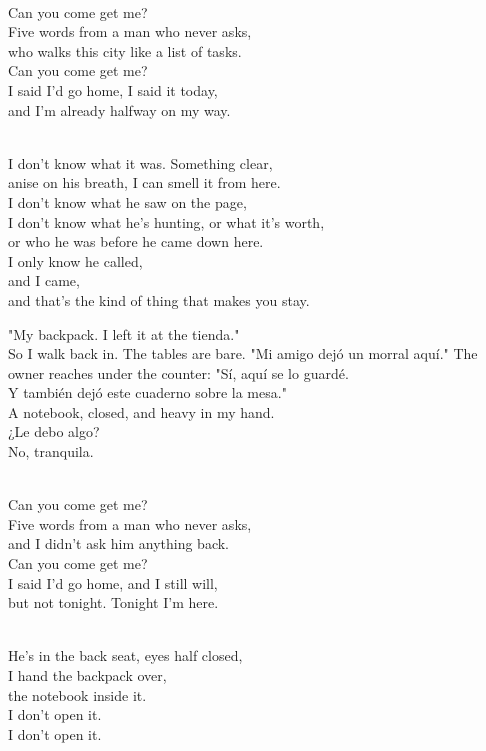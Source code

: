 \begin{lyrics}
\\
Can you come get me?\\
Five words from a man who never asks,\\
who walks this city like a list of tasks.\\
Can you come get me?\\
I said I'd go home, I said it today,\\
and I'm already halfway on my way.

\\
I don't know what it was. Something clear,\\
anise on his breath, I can smell it from here.\\
I don't know what he saw on the page,\\
I don't know what he's hunting, or what it's worth,\\
or who he was before he came down here.\\
I only know he called,\\
and I came,\\
and that's the kind of thing that makes you stay.

"My backpack. I left it at the tienda."
\\
So I walk back in. The tables are bare.
 "Mi amigo dejó un morral aquí."
 The owner reaches under the counter:
"Sí, aquí se lo guardé.\\
Y también dejó este cuaderno sobre la mesa."
\\
A notebook, closed, and heavy in my hand.
\\
¿Le debo algo?
\\
No, tranquila.

\\
Can you come get me?\\
Five words from a man who never asks,\\
and I didn't ask him anything back.\\
Can you come get me?\\
I said I'd go home, and I still will,\\
but not tonight. Tonight I'm here.

\\
He's in the back seat, eyes half closed,\\
I hand the backpack over,\\
the notebook inside it.\\
I don't open it.\\
I don't open it.
\end{lyrics}

